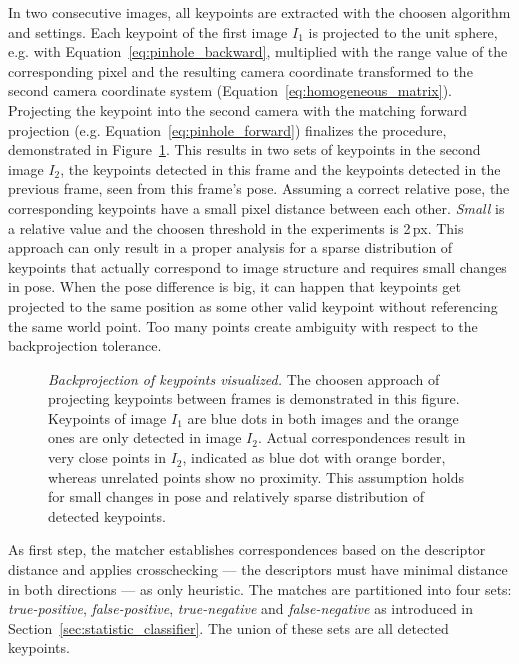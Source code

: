 In two consecutive images, all keypoints are extracted with the choosen algorithm and settings.
Each keypoint of the first image $I_1$ is projected to the unit sphere, e.g. with Equation~\ref{eq:pinhole_backward}, multiplied with the range value of the corresponding pixel and the resulting camera coordinate transformed to the second camera coordinate system (Equation~\ref{eq:homogeneous_matrix}).
Projecting the keypoint into the second camera with the matching forward projection (e.g. Equation~\ref{eq:pinhole_forward}) finalizes the procedure, demonstrated in Figure~\ref{fig:keypoint_projection}.
This results in two sets of keypoints in the second image $I_2$, the keypoints detected in this frame and the keypoints detected in the previous frame, seen from this frame's pose.
Assuming a correct relative pose, the corresponding keypoints have a small pixel distance between each other.
\emph{Small} is a relative value and the choosen threshold in the experiments is 2\,px.
This approach can only result in a proper analysis for a sparse distribution of keypoints that actually correspond to image structure and requires small changes in pose.
When the pose difference is big, it can happen that keypoints get projected to the same position as some other valid keypoint without referencing the same world point.
Too many points create ambiguity with respect to the backprojection tolerance.
\begin{figure}[b!]
    
    \caption[Backprojection of keypoints visualized]{\emph{Backprojection of keypoints visualized.} The choosen approach of projecting keypoints between frames is demonstrated in this figure. Keypoints of image $I_1$ are blue dots in both images and the orange ones are only detected in image $I_2$. Actual correspondences result in very close points in $I_2$, indicated as blue dot with orange border, whereas unrelated points show no proximity. This assumption holds for small changes in pose and relatively sparse distribution of detected keypoints.}\label{fig:keypoint_projection}
\end{figure}
As first step, the matcher establishes correspondences based on the descriptor distance and applies crosschecking --- the descriptors must have minimal distance in both directions --- as only heuristic.
The matches are partitioned into four sets: \emph{true-positive}, \emph{false-positive}, \emph{true-negative} and \emph{false-negative} as introduced in Section~\ref{sec:statistic_classifier}.
The union of these sets are all detected keypoints.
